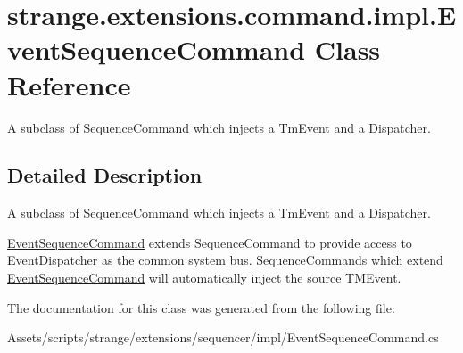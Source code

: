 \hypertarget{classstrange_1_1extensions_1_1command_1_1impl_1_1_event_sequence_command}{\section{strange.\-extensions.\-command.\-impl.\-Event\-Sequence\-Command Class Reference}
\label{classstrange_1_1extensions_1_1command_1_1impl_1_1_event_sequence_command}
}


A subclass of Sequence\-Command which injects a Tm\-Event and a Dispatcher.  




\subsection{Detailed Description}
A subclass of Sequence\-Command which injects a Tm\-Event and a Dispatcher. 

\hyperlink{classstrange_1_1extensions_1_1command_1_1impl_1_1_event_sequence_command}{Event\-Sequence\-Command} extends Sequence\-Command to provide access to Event\-Dispatcher as the common system bus. Sequence\-Commands which extend \hyperlink{classstrange_1_1extensions_1_1command_1_1impl_1_1_event_sequence_command}{Event\-Sequence\-Command} will automatically inject the source T\-M\-Event. 

The documentation for this class was generated from the following file\-:\begin{DoxyCompactItemize}
\item 
Assets/scripts/strange/extensions/sequencer/impl/Event\-Sequence\-Command.\-cs\end{DoxyCompactItemize}
